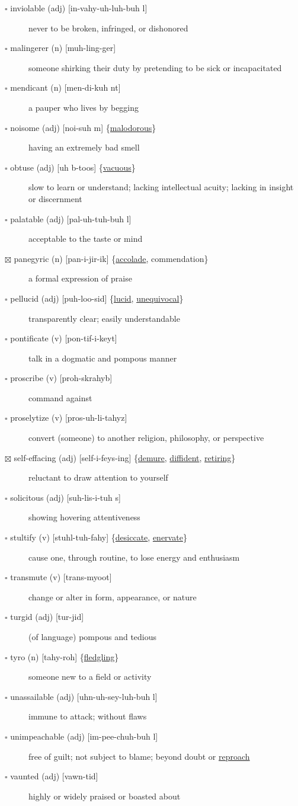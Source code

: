 \documentclass[11pt]{article}
\begin{document}
\begin{description}
\item[{$\square$ inviolable (adj) [in-vahy-uh-luh-buh l]}] never to be broken, infringed, or dishonored
\item[{$\square$ malingerer (n) [muh-ling-ger]}] someone shirking their duty by pretending to be sick or incapacitated
\item[{$\square$ mendicant (n) [men-di-kuh nt]}] a pauper who lives by begging
\item[{$\square$ \label{org35a15a1}noisome (adj) [noi-suh m] \{\hyperref[orgc605993]{malodorous}\}}] having an extremely bad smell
\item[{$\square$ \label{org69e0c85}obtuse (adj) [uh b-toos] \{\hyperref[org47f0b96]{vacuous}\}}] slow to learn or understand; lacking intellectual acuity; lacking in insight or discernment
\item[{$\square$ palatable (adj) [pal-uh-tuh-buh l]}] acceptable to the taste or mind
\item[{$\boxtimes$ \label{org7873186}panegyric (n) [pan-i-jir-ik] \{\hyperref[org8a0248d]{accolade}, commendation\}}] a formal expression of praise
\item[{$\square$ \label{org9cbc3b4}pellucid (adj) [puh-loo-sid] \{\hyperref[org6dfd5c3]{lucid}, \hyperref[org54a7180]{unequivocal}\}}] transparently clear; easily understandable
\item[{$\square$ \label{org62d97c4} \label{org08768f7}pontificate (v) [pon-tif-i-keyt]}] talk in a dogmatic and pompous manner
\item[{$\square$ proscribe (v) [proh-skrahyb]}] command against
\item[{$\square$ proselytize (v) [pros-uh-li-tahyz]}] convert (someone) to another religion, philosophy, or perspective
\item[{$\boxtimes$ \label{org506513a}self-effacing (adj) [self-i-feys-ing] \{\hyperref[orga7b7e07]{demure}, \hyperref[org76fbc15]{diffident}, \hyperref[org686afa2]{retiring}\}}] reluctant to draw attention to yourself
\item[{$\square$ solicitous (adj) [suh-lis-i-tuh s]}] showing hovering attentiveness
\item[{$\square$ \label{orgf2ecf81}stultify (v) [stuhl-tuh-fahy] \{\hyperref[orge9b51d7]{desiccate}, \hyperref[org985e694]{enervate}\}}] cause one, through routine, to lose energy and enthusiasm
\item[{$\square$ transmute (v) [trans-myoot]}] change or alter in form, appearance, or nature
\item[{$\square$ turgid (adj) [tur-jid]}] (of language) pompous and tedious
\item[{$\square$ \label{org1f29c8d}tyro (n) [tahy-roh] \{\hyperref[orgecf834e]{fledgling}\}}] someone new to a field or activity
\item[{$\square$ unassailable (adj) [uhn-uh-sey-luh-buh l]}] immune to attack; without flaws
\item[{$\square$ unimpeachable (adj) [im-pee-chuh-buh l]}] free of guilt; not subject to blame; beyond doubt or \hyperref[org3cb95b6]{reproach}
\item[{$\square$ vaunted (adj) [vawn-tid]}] highly or widely praised or boasted about
\end{description}
\end{document}
